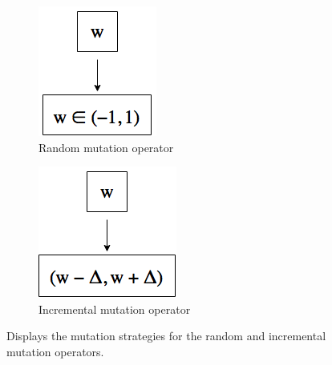 \begin{figure}[H]
	\centering
	\begin{subfigure}{0.3\textwidth}
		\label{fig:mutation-random}
		\centering
		\includegraphics[height=\linewidth]{chapters/res/mutation_random.png}
		\caption{Random mutation operator}
	\end{subfigure}
	\begin{subfigure}{0.3\textwidth}
		\label{fig:mutation-incremental}
		\centering
		\includegraphics[height=\linewidth]{chapters/res/mutation_incremental.png}
		\caption{Incremental mutation operator}
	\end{subfigure}
	\caption{Displays the mutation strategies for the random and incremental mutation operators.}
	\label{fig:mutation-operators}
\end{figure}


